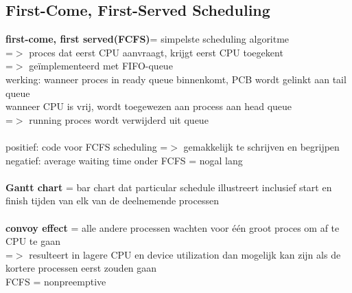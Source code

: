 \documentclass{report}
\begin{document}
\subsection{First-Come, First-Served Scheduling}
\textbf{first-come, first served(FCFS)}= simpelste scheduling algoritme
\\=$>$ proces dat eerst CPU aanvraagt, krijgt eerst CPU toegekent
\\=$>$ ge\"implementeerd met FIFO-queue
\\werking: wanneer proces in ready queue binnenkomt, PCB wordt gelinkt aan tail queue
\\wanneer CPU is vrij, wordt toegewezen aan process aan head queue
\\=$>$ running proces wordt verwijderd uit queue
\\
\\positief: code voor FCFS scheduling =$>$ gemakkelijk te schrijven en begrijpen
\\negatief: average waiting time onder FCFS = nogal lang
\\
\\\textbf{Gantt chart} = bar chart dat particular schedule illustreert inclusief start en finish tijden van elk van de deelnemende processen
\\
\\\textbf{convoy effect} = alle andere processen wachten voor \'e\'en groot proces om af te CPU te gaan 
\\=$>$ resulteert in lagere CPU en device utilization dan mogelijk kan zijn als de kortere processen eerst zouden gaan
\\FCFS = nonpreemptive
\end{document}
